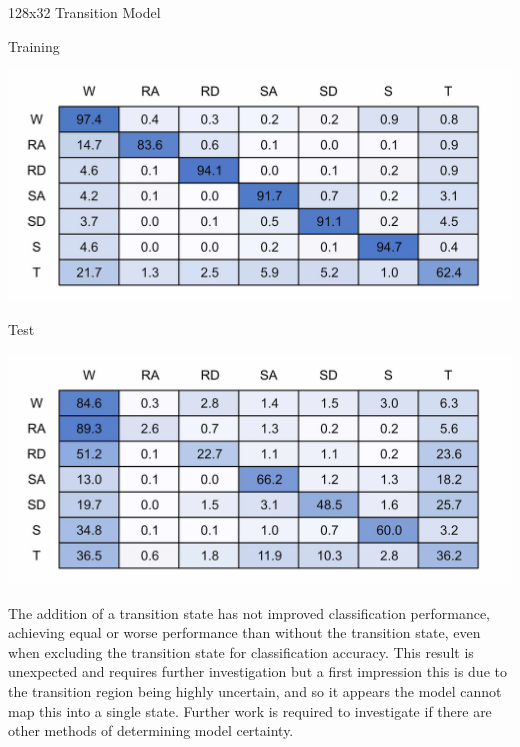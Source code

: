 \documentclass[sensors,article,submit,moreauthors,pdftex]{Definitions/mdpi}
\begin{document}
\begin{table}[!hbt]
    \centering
    \caption{128x32 Transition Model}
    \label{tab:128x32_transition_confusion_matrix}
    \begin{subtable}{.45\textwidth}
        \centering
        \caption{Training}
        \label{tab:tran_model_conf_matrix_training_128x32}
        \includegraphics[width=\textwidth]{Figures/results/conf_matricies/Training_128x32_T.jpg}
    \end{subtable}
    \hfil
    \begin{subtable}{.45\textwidth}
        \centering
        \caption{Test}
        \label{tab:tran_model_conf_matrix_test_128x32}
        \includegraphics[width=\textwidth]{Figures/results/conf_matricies/Test_128x32_T.jpg}
    \end{subtable}
\end{table}

The addition of a transition state has not improved classification performance, achieving equal or worse performance than without the transition state, even when excluding the transition state for classification accuracy. This result is unexpected and requires further investigation but a first impression this is due to the transition region being highly uncertain, and so it appears the model cannot map this into a single state. Further work is required to investigate if there are other methods of determining model certainty.
\end{document}
